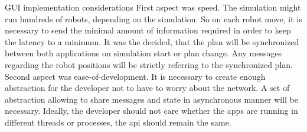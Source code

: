 \sec GUI implementation considerations
First aspect was speed. The simulation might run hundreds of robots, depending on the simulation. So on each robot move, it is necessary to send the minimal amount of information required in order to keep the latency to a minimum. 
It was the decided, that the plan will be synchronized between both applications on simulation start or plan change. Any messages regarding the robot positions will be strictly referring to the synchronized plan.
Second aspect was ease-of-development. It is necessary to create enough abstraction for the developer not to have to worry about the network. A set of abstraction allowing to share messages and state in asynchronous manner will be necessary. Ideally, the developer should not care whether the apps are running in different threads or processes, the api should remain the same.
